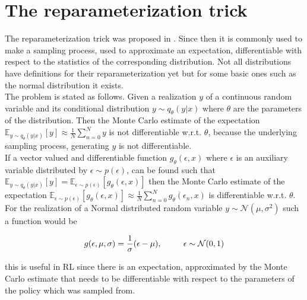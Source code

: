 \section{The reparameterization trick} \label{ssec:reparam}
The reparameterization trick was proposed in \cite{kingma2013autoencoding}. Since then it is commonly used to make a sampling process, used to approximate an expectation, differentiable with respect to the statistics of the corresponding distribution. Not all distributions have definitions for their reparameterization yet but for some basic ones such as the normal distribution it exists.\\
The problem is stated as follows. Given a realization $y$ of a continuous random variable and its conditional distribution $y\sim q_{\theta}(y|x)$ where $\theta$ are the parameters of the distribution. Then the Monte Carlo estimate of the expectation $\mathbb{E}_{y \sim q_{\theta}(y|x)}[y] \approx \frac{1}{N}\sum_{n=0}^N y$ is not differentiable w.r.t. $\theta$, because the underlying sampling process, generating $y$ is not differentiable.\\

If a vector valued and differentiable function $g_{\theta}(\epsilon, x)$ where $\epsilon$ is an auxiliary variable distributed by $\epsilon \sim p(\epsilon)$, can be found such that $\mathbb{E}_{y\sim q_{\theta}(y|x)}[y] = \mathbb{E}_{\epsilon\sim p(\epsilon)}[g_{\theta}(\epsilon, x)]$ then the Monte Carlo estimate of the expectation $\mathbb{E}_{\epsilon\sim p(\epsilon)}[g_{\theta}(\epsilon, x)] \approx \frac{1}{N}\sum_{n=0}^N g_{\theta}(\epsilon_n, x)$ is differentiable w.r.t. $\theta$.\\

For the realization of a Normal distributed random variable $y \sim \mathcal{N}(\mu, \sigma^2)$ such a function would be

\begin{align}
	g(\epsilon, \mu, \sigma) = \frac{1}{\sigma}(\epsilon - \mu), \text{\hspace{8mm} $\epsilon \sim \mathcal{N}(0, 1)$}
\end{align}

this is useful in RL since there is an expectation, approximated by the Monte Carlo estimate that needs to be differentiable with respect to the parameters of the policy which was sampled from.